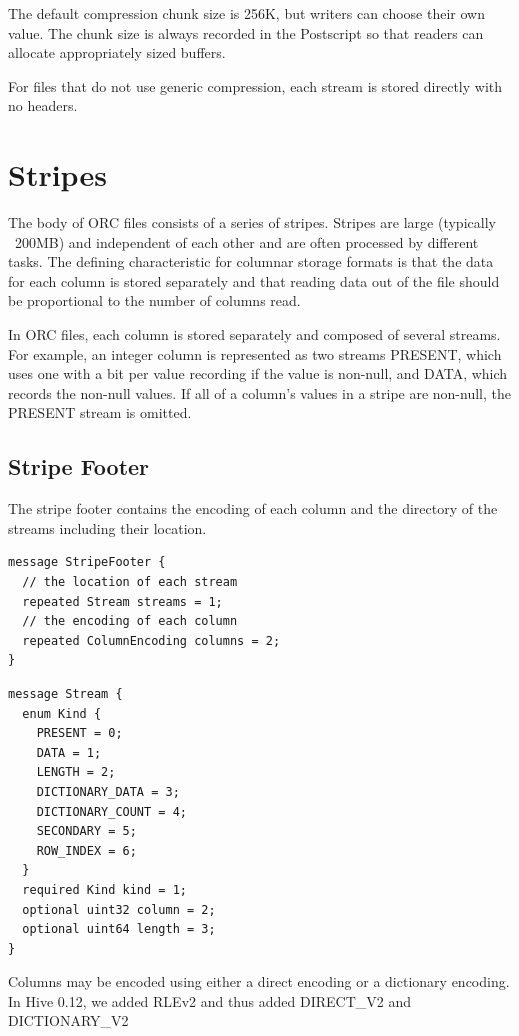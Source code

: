 \documentclass{article}
\begin{document}
The default compression chunk size is 256K, but writers can choose
their own value.  The chunk size is always recorded in the Postscript
so that readers can allocate appropriately sized buffers.

For files that do not use generic compression, each stream is stored
directly with no headers.

\section{Stripes}

The body of ORC files consists of a series of stripes. Stripes are
large (typically ~200MB) and independent of each other and are often
processed by different tasks. The defining characteristic for columnar
storage formats is that the data for each column is stored separately
and that reading data out of the file should be proportional to the
number of columns read.

In ORC files, each column is stored separately and composed of several
streams. For example, an integer column is represented as two streams
PRESENT, which uses one with a bit per value recording if the value is
non-null, and DATA, which records the non-null values. If all of a
column's values in a stripe are non-null, the PRESENT stream is
omitted.

\subsection{Stripe Footer}

The stripe footer contains the encoding of each column and the
directory of the streams including their location.

\begin{verbatim}
message StripeFooter {
  // the location of each stream
  repeated Stream streams = 1;
  // the encoding of each column
  repeated ColumnEncoding columns = 2;
}
\end{verbatim}


\begin{verbatim}
message Stream {
  enum Kind {
    PRESENT = 0;
    DATA = 1;
    LENGTH = 2;
    DICTIONARY_DATA = 3;
    DICTIONARY_COUNT = 4;
    SECONDARY = 5;
    ROW_INDEX = 6;
  }
  required Kind kind = 1;
  optional uint32 column = 2;
  optional uint64 length = 3;
}
\end{verbatim}

Columns may be encoded using either a direct encoding or a dictionary
encoding. In Hive 0.12, we added RLEv2 and thus added DIRECT\_V2 and
DICTIONARY\_V2
\end{document}
